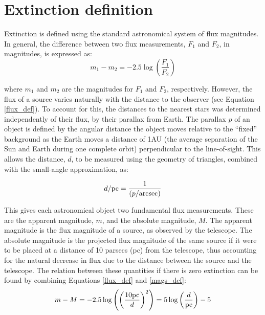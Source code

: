 \documentclass[12pt, a4paper]{report}
\begin{document}
\section{Extinction definition} \label{extinc_desc}
Extinction is defined using the standard astronomical system of flux magnitudes. In general, the difference between two flux measurements, $F_{1}$ and $F_{2}$, in magnitudes, is expressed as:
\begin{equation}
\label{mags_def}
m_{1} - m_{2} = -2.5\log \left( \frac{F_{1}}{F_{2}} \right)
\end{equation}

where $m_{1}$ and $m_{2}$ are the magnitudes for $F_{1}$ and $F_{2}$, respectively. However, the flux of a source varies naturally with the distance to the observer (see Equation \ref{flux_def}). To account for this, the distances to the nearest stars was determined independently of their flux, by their parallax from Earth. The parallax $p$ of an object is defined by the angular distance the object moves relative to the ``fixed'' background as the Earth moves a distance of 1AU (the average separation of the Sun and Earth during one complete orbit) perpendicular to the line-of-sight. This allows the distance, $d$, to be measured using the geometry of triangles, combined with the small-angle approximation, as:

\begin{equation}
d/\textnormal{pc} = \frac{1}{(p/\textnormal{arcsec})}
\end{equation}

This gives each astronomical object two fundamental flux measurements. These are the apparent magnitude, $m$, and the absolute magnitude, $M$. The apparent magnitude is the flux magnitude of a source, as observed by the telescope. The absolute magnitude is the projected flux magnitude of the same source if it were to be placed at a distance of 10 parsecs (pc) from the telescope, thus accounting for the natural decrease in flux due to the distance between the source and the telescope. The relation between these quantities if there is zero extinction can be found by combining Equations \ref{flux_def} and \ref{mags_def}:
\begin{equation}
\label{distance_modulus}
m - M = -2.5\log \left( \left(\frac{10\textnormal{pc}}{d}\right)^{2} \right) = 5\log\left(\frac{d}{\textnormal{pc}}\right) - 5
\end{equation}
\end{document}
